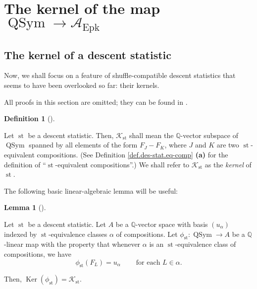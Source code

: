 \documentclass[numbers=enddot,12pt,final,onecolumn,notitlepage]{scrartcl}%
\theoremstyle{definition}
\newtheorem{lem}[theo]{Lemma}
\newenvironment{lemma}[1][]
{\begin{lem}[#1]\begin{leftbar}}
{\end{leftbar}\end{lem}}
\newtheorem{defi}[theo]{Definition}
\newenvironment{definition}[1][]
{\begin{defi}[#1]\begin{leftbar}}
{\end{leftbar}\end{defi}}
\newenvironment{vershort}{}{}
\begin{document}
\section{\label{sect.kernel}The kernel of the map $\operatorname*{QSym}%
\rightarrow\mathcal{A}_{\operatorname*{Epk}}$}

\subsection{The kernel of a descent statistic}

Now, we shall focus on a feature of shuffle-compatible descent statistics that
seems to have been overlooked so far: their kernels.

\begin{vershort}
All proofs in this section are omitted; they can be found in \cite{verlong}.
\end{vershort}

\begin{definition}
Let $\operatorname*{st}$ be a descent statistic. Then, $\mathcal{K}%
_{\operatorname*{st}}$ shall mean the $\mathbb{Q}$-vector subspace of
$\operatorname*{QSym}$ spanned by all elements of the form $F_{J}-F_{K}$,
where $J$ and $K$ are two $\operatorname*{st}$-equivalent compositions. (See
Definition \ref{def.des-stat.eq-comp} \textbf{(a)} for the definition of
\textquotedblleft$\operatorname*{st}$-equivalent
compositions\textquotedblright.) We shall refer to $\mathcal{K}%
_{\operatorname*{st}}$ as the \textit{kernel} of $\operatorname*{st}$.
\end{definition}

The following basic linear-algebraic lemma will be useful:

\begin{lemma}
\label{lem.K.fist}Let $\operatorname*{st}$ be a descent statistic. Let $A$ be
a $\mathbb{Q}$-vector space with basis $\left(  u_{\alpha}\right)  $ indexed
by $\operatorname*{st}$-equivalence classes $\alpha$ of compositions. Let
$\phi_{\operatorname*{st}}:\operatorname*{QSym}\rightarrow A$ be a
$\mathbb{Q}$-linear map with the property that whenever $\alpha$ is an
$\operatorname*{st}$-equivalence class of compositions, we have%
\begin{equation}
\phi_{\operatorname*{st}}\left(  F_{L}\right)  =u_{\alpha}%
\ \ \ \ \ \ \ \ \ \ \text{for each }L\in\alpha. \label{pf.prop.K.ideal.dir1.1}%
\end{equation}


Then, $\operatorname*{Ker}\left(  \phi_{\operatorname*{st}}\right)
=\mathcal{K}_{\operatorname*{st}}$.
\end{lemma}
\end{document}
